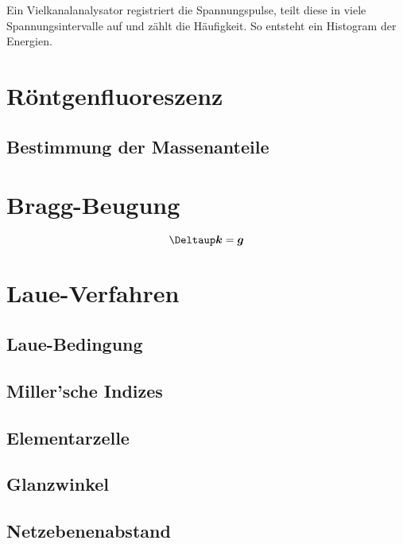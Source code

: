 Ein Vielkanalanalysator registriert die Spannungspulse, teilt diese in viele
Spannungsintervalle auf und zählt die Häufigkeit.
\parencite{Phywe/Vierkanalanalysator} So entsteht ein Histogram der Energien.
\parencite{wikipedia/Vielkanalanalysator}

\section{Röntgenfluoreszenz}

\subsection{Bestimmung der Massenanteile}

\parencite[„Massenanteilsbestimmung“]{physik412-Anleitung}

\section{Bragg-Beugung}

\parencite[(18.4)]{meschede-gerthsen_24}
\[
    \Deltaup \vec k = \vec g
\]

\section{Laue-Verfahren}

\parencite[P428.5.3, „Auswertung“]{physik412-Anleitung}

\subsection{Laue-Bedingung}

\subsection{Miller'sche Indizes}

\subsection{Elementarzelle}

\subsection{Glanzwinkel}

\subsection{Netzebenenabstand}

